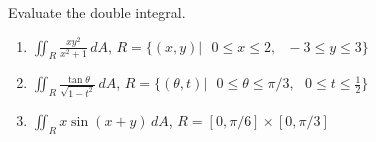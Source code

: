 \begin{Exercise}[label = fubini_2]
Evaluate the double integral. 
\begin{enumerate}
\item $\iint_R \frac{xy^2}{x^2 + 1}\,dA$, $\textit{R} = \{ \left( x, y \right) 
| \text{ } 0 \leq x \leq 2, \text{ } -3 \leq y \leq 3 \}$
\item $\iint_R \frac{\tan{\theta}}{\sqrt{1 - t^2}}\,dA$, $\textit{R} = \{ 
\left( \theta, t \right) | \text{ } 0 \leq \theta \leq \pi/3, \text{ } 0 \leq 
t \leq \frac{1}{2} \}$
\item $\iint_R x \sin{ \left( x + y \right) }\,dA$, $\textit{R} = \left[0, 
\pi/6 \right] \times \left[ 0, \pi/3 \right]$
\end{enumerate}
\end{Exercise}

